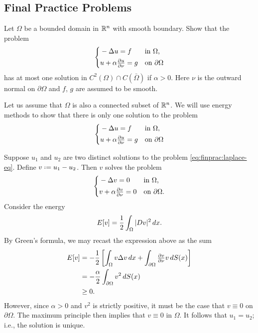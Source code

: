 \subsection{Final Practice Problems}
\begin{problem}
  Let \(\Omega\) be a bounded domain in \(\mathbb{R}^n\) with smooth boundary. Show
  that the problem
  \[
    \left\{
      \begin{aligned}
        &-\Delta u=f&&\text{in \(\Omega\),}\\
        &u+\alpha\tfrac{\partial u}{\partial\nu}=g&&\text{on \(\partial\Omega\)}
      \end{aligned}
    \right.
  \]
  has at most one solution in \(C^2(\Omega)\cap C(\bar\Omega)\) if
  \(\alpha>0\). Here \(\nu\) is the outward normal on \(\partial\Omega\)
  and \(f\), \(g\) are assumed to be smooth.
\end{problem}
\begin{solution*}
  Let us assume that \(\Omega\) is also a connected subset of \(\mathbb{R}^n\). We
  will use energy methods to show that there is only one solution to the
  problem
  \begin{equation}
    \label{eq:finprac:laplace-eq}
    \left\{
      \begin{aligned}
        &-\Delta u=f&&\text{in \(\Omega\),}\\
        &u+\alpha\tfrac{\partial u}{\partial\nu}=g&&\text{on \(\partial\Omega\)}
      \end{aligned}
    \right.
  \end{equation}

  Suppose \(u_1\) and \(u_2\) are two distinct solutions to the problem
  \eqref{eq:finprac:laplace-eq}. Define \(v\defeq u_1-u_2\). Then \(v\)
  solves the problem
  \[
    \left\{
      \begin{aligned}
        &-\Delta v=0&&\text{in \(\Omega\),}\\
        &v+\alpha\tfrac{\partial v}{\partial\nu}=0&&\text{on \(\partial\Omega\).}
      \end{aligned}
    \right.
  \]
  Consider the energy
  \[
    E[v]=\frac{1}{2}\int_\Omega|Dv|^2\mathop{}\!d x.
  \]
  By Green's formula, we may recast the expression above as the sum
  \begin{align*}
    E[v]
    &=-\frac{1}{2}
      \left[%
      \int_\Omega v\Lap v\diff x%
      +\int_{\partial\Omega}\tfrac{\partial v}{\partial\nu }v\diff S(x)%
      \right]\\
    &=-\frac{\alpha}{2}\int_{\partial\Omega} v^2\diff S(x)\\
    &\geq 0.
  \end{align*}
  However, since \(\alpha>0\) and \(v^2\) is strictly positive, it must be
  the case that \(v\equiv 0\) on \(\partial\Omega\). The maximum principle
  then implies that \(v\equiv 0\) in \(\Omega\). It follows that
  \(u_1=u_2\); i.e., the solution is unique.
\end{solution*}

